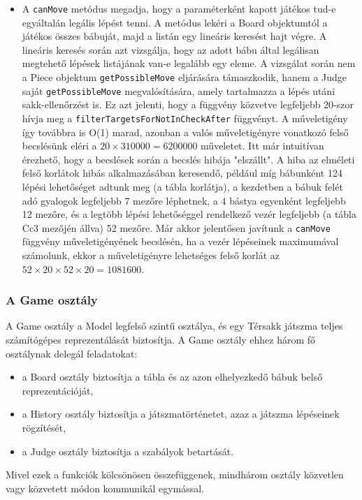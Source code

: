 \documentclass[12pt, twoside]{report}
\begin{document}
\begin{itemize}
	\item A {\tt canMove} metódus megadja, hogy a paraméterként kapott játékos tud-e egyáltalán legális lépést tenni. A metódus lekéri a Board objektumtól a játékos összes bábuját, majd a listán egy lineáris keresést hajt végre. A lineáris keresés során azt vizsgálja, hogy az adott bábu által legálisan megtehető lépések listájának van-e legalább egy eleme. A vizsgálat során nem a Piece objektum {\tt getPossibleMove} eljárására támaszkodik, hanem a Judge saját {\tt getPossibleMove} megvalósítására, amely tartalmazza a lépés utáni sakk-ellenőrzést is. Ez azt jelenti, hogy a függvény közvetve legfeljebb 20-szor hívja meg a {\tt filterTargetsForNotInCheckAfter} függvényt. A műveletigény így továbbra is O(1) marad, azonban a valós műveletigényre vonatkozó felső becslésünk eléri a $20 \times 310000 = 6200000$ műveletet. Itt már intuitívan érezhető, hogy a becslések során a becslés hibája "elszállt". A hiba az elméleti felső korlátok hibás alkalmazásában keresendő, például míg bábunként 124 lépési lehetőséget adtunk meg (a tábla korlátja), a kezdetben a bábuk felét adó gyalogok legfeljebb 7 mezőre léphetnek, a 4 bástya egyenként legfeljebb 12 mezőre, és a legtöbb lépési lehetőséggel rendelkező vezér legfeljebb (a tábla Cc3 mezőjén állva) 52 mezőre. Már akkor jelentősen javítunk a {\tt canMove} függvény műveletigényének becslésén, ha a vezér lépéseinek maximumával számolunk, ekkor a műveletigényre lehetséges felső korlát az $ 52 \times 20 \times 52 \times 20 = 1081600$.
\end{itemize}

\subsubsection{A Game osztály}

A Game osztály a Model legfelső szintű osztálya, és egy Térsakk játszma teljes számítógépes reprezentálását biztosítja. A Game osztály ehhez három fő osztálynak delegál feladatokat:
\begin{itemize}
	\item a Board osztály biztosítja a tábla és az azon elhelyezkedő bábuk belső reprezentációját,
	\item a History osztály biztosítja a játszmatörténetet, azaz a játszma lépéseinek rögzítését,
	\item a Judge osztály biztosítja a szabályok betartását.
\end{itemize}
Mivel ezek a funkciók kölcsönösen összefüggenek, mindhárom osztály közvetlen vagy közvetett módon kommunikál egymással.
\end{document}

